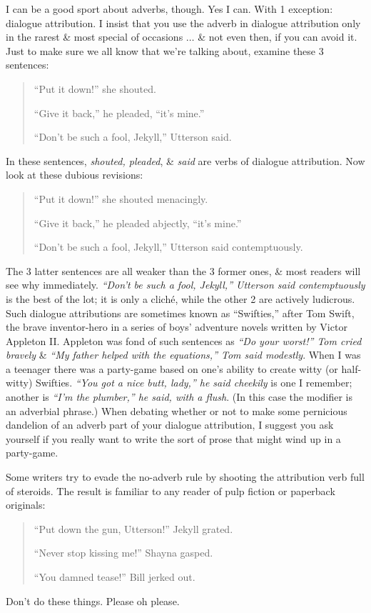\documentclass{article}
\numberwithin{equation}{section}
\begin{document}
I can be a good sport about adverbs, though. Yes I can. With 1 exception: dialogue attribution. I insist that you use the adverb in dialogue attribution only in the rarest \& most special of occasions $\ldots$ \& not even then, if you can avoid it. Just to make sure we all know that we're talking about, examine these 3 sentences:
\begin{quotation}
	``Put it down!'' she shouted.
	
	``Give it back,'' he pleaded, ``it's mine.''
	
	``Don't be such a fool, Jekyll,'' Utterson said.
\end{quotation}
In these sentences, \textit{shouted, pleaded}, \& \textit{said} are verbs of dialogue attribution. Now look at these dubious revisions:
\begin{quotation}
	``Put it down!'' she shouted menacingly.
	
	``Give it back,'' he pleaded abjectly, ``it's mine.''
	
	``Don't be such a fool, Jekyll,'' Utterson said contemptuously.
\end{quotation}
The 3 latter sentences are all weaker than the 3 former ones, \& most readers will see why immediately. \textit{``Don't be such a fool, Jekyll,'' Utterson said contemptuously} is the best of the lot; it is only a clich\'e, while the other 2 are actively ludicrous. Such dialogue attributions are sometimes known as ``Swifties,'' after Tom Swift, the brave inventor-hero in a series of boys' adventure novels written by Victor Appleton II. Appleton was fond of such sentences as \textit{``Do your worst!'' Tom cried bravely} \& \textit{``My father helped with the equations,'' Tom said modestly}. When I was a teenager there was a party-game based on one's ability to create witty (or half-witty) Swifties. \textit{``You got a nice butt, lady,'' he said cheekily} is one I remember; another is \textit{``I'm the plumber,'' he said, with a flush}. (In this case the modifier is an adverbial phrase.) When debating whether or not to make some pernicious dandelion of an adverb part of your dialogue attribution, I suggest you ask yourself if you really want to write the sort of prose that might wind up in a party-game.

Some writers try to evade the no-adverb rule by shooting the attribution verb full of steroids. The result is familiar to any reader of pulp fiction or paperback originals:
\begin{quotation}
	``Put down the gun, Utterson!'' Jekyll grated.
	
	``Never stop kissing me!'' Shayna gasped.
	
	``You damned tease!'' Bill jerked out.
\end{quotation}
Don't do these things. Please oh please.
\end{document}
